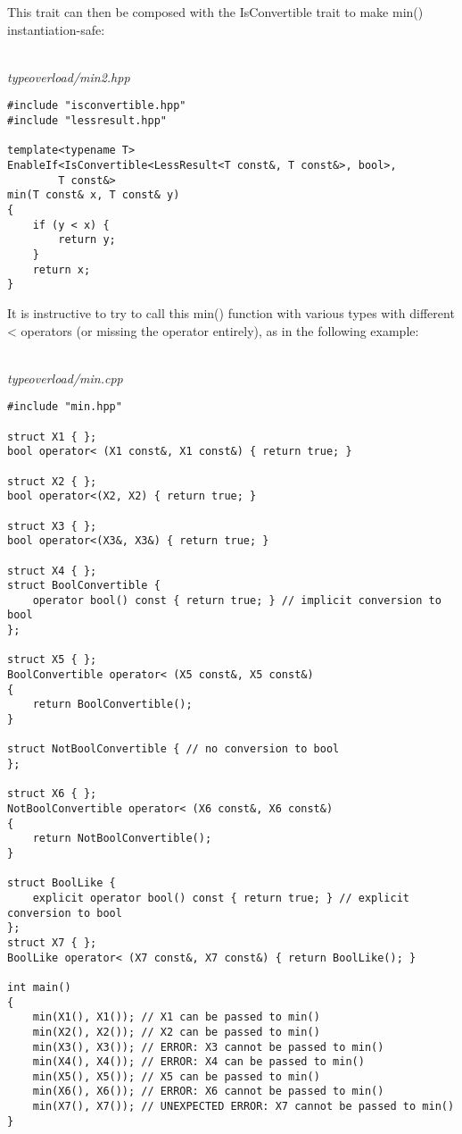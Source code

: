 This trait can then be composed with the IsConvertible trait to make min() instantiation-safe:

\hspace*{\fill} \\ %
\noindent
\textit{typeoverload/min2.hpp}
\begin{lstlisting}[style=styleCXX]
#include "isconvertible.hpp"
#include "lessresult.hpp"

template<typename T>
EnableIf<IsConvertible<LessResult<T const&, T const&>, bool>,
		T const&>
min(T const& x, T const& y)
{
	if (y < x) {
		return y;
	}
	return x;
}
\end{lstlisting}

It is instructive to try to call this min() function with various types with different < operators (or missing the operator entirely), as in the following example:

\hspace*{\fill} \\ %
\noindent
\textit{typeoverload/min.cpp}
\begin{lstlisting}[style=styleCXX]
#include "min.hpp"

struct X1 { };
bool operator< (X1 const&, X1 const&) { return true; }

struct X2 { };
bool operator<(X2, X2) { return true; }

struct X3 { };
bool operator<(X3&, X3&) { return true; }

struct X4 { };
struct BoolConvertible {
	operator bool() const { return true; } // implicit conversion to bool
};

struct X5 { };
BoolConvertible operator< (X5 const&, X5 const&)
{
	return BoolConvertible();
}

struct NotBoolConvertible { // no conversion to bool
};

struct X6 { };
NotBoolConvertible operator< (X6 const&, X6 const&)
{
	return NotBoolConvertible();
}

struct BoolLike {
	explicit operator bool() const { return true; } // explicit conversion to bool
};
struct X7 { };
BoolLike operator< (X7 const&, X7 const&) { return BoolLike(); }

int main()
{
	min(X1(), X1()); // X1 can be passed to min()
	min(X2(), X2()); // X2 can be passed to min()
	min(X3(), X3()); // ERROR: X3 cannot be passed to min()
	min(X4(), X4()); // ERROR: X4 can be passed to min()
	min(X5(), X5()); // X5 can be passed to min()
	min(X6(), X6()); // ERROR: X6 cannot be passed to min()
	min(X7(), X7()); // UNEXPECTED ERROR: X7 cannot be passed to min()
}
\end{lstlisting}

